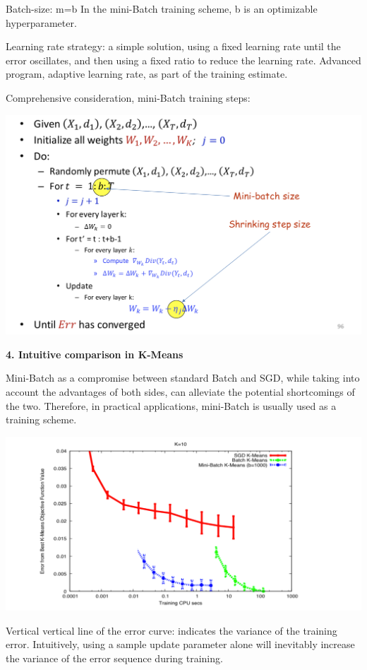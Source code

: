 \documentclass{article}
\begin{document}
	Batch-size: m=b In the mini-Batch training scheme, b is an optimizable hyperparameter.
	
	Learning rate strategy: a simple solution, using a fixed learning rate until the error oscillates, and then using a fixed ratio to reduce the learning rate. Advanced program, adaptive learning rate, as part of the training estimate.
	
	Comprehensive consideration, mini-Batch training steps:
	
	\includegraphics[scale=0.2]{90.png}
	
	\textbf{4. Intuitive comparison in K-Means}
	
	Mini-Batch as a compromise between standard Batch and SGD, while taking into account the advantages of both sides, can alleviate the potential shortcomings of the two. Therefore, in practical applications, mini-Batch is usually used as a training scheme.
	
	\includegraphics[scale=0.2]{91.png}
	
	Vertical vertical line of the error curve: indicates the variance of the training error. Intuitively, using a sample update parameter alone will inevitably increase the variance of the error sequence during training.
	
\end{document}

